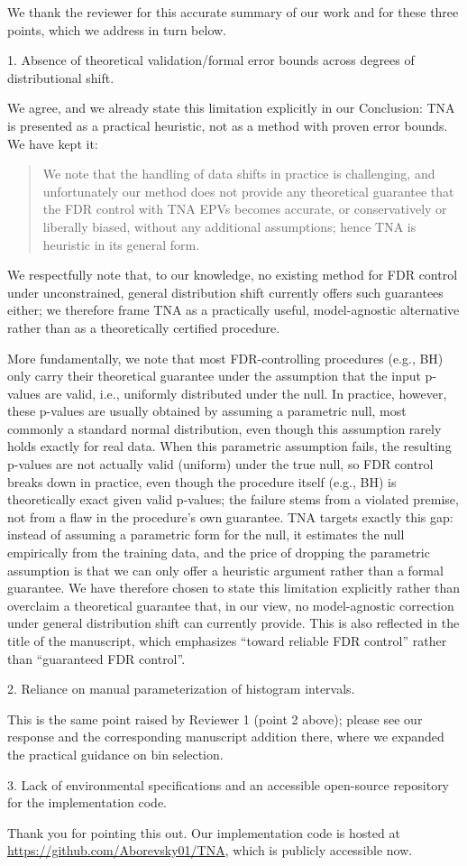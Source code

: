 \documentclass{article}
\newcommand{\response}[1]{\vspace*{1ex} \color{blue} \noindent #1 \color{black}
\vspace*{2ex}}
\newcommand{\edit}[1]{\begin{quotation}\color{red}\noindent #1
\color{black}\end{quotation}}
\begin{document}
\response{We thank the reviewer for this accurate summary of our work and for these three points, which we address in turn below.}

1. Absence of theoretical validation/formal error bounds across degrees of distributional shift.

\response{We agree, and we already state this limitation explicitly in our Conclusion: TNA is presented as a practical heuristic, not as a method with proven error bounds. We have kept it:}

\edit{We note that the handling of data shifts in practice is challenging, and unfortunately our method does not provide any theoretical guarantee that the FDR control with TNA EPVs becomes accurate, or conservatively or liberally biased, without any additional assumptions; hence TNA is heuristic in its general form. }

\response{We respectfully note that, to our knowledge, no existing method for FDR control under unconstrained, general distribution shift currently offers such guarantees either; we therefore frame TNA as a practically useful, model-agnostic alternative rather than as a theoretically certified procedure.}

\response{More fundamentally, we note that most FDR-controlling procedures (e.g., BH) only carry their theoretical guarantee under the assumption that the input p-values are valid, i.e., uniformly distributed under the null. In practice, however, these p-values are usually obtained by assuming a parametric null, most commonly a standard normal distribution, even though this assumption rarely holds exactly for real data. When this parametric assumption fails, the resulting p-values are not actually valid (uniform) under the true null, so FDR control breaks down in practice, even though the procedure itself (e.g., BH) is theoretically exact given valid p-values; the failure stems from a violated premise, not from a flaw in the procedure's own guarantee. TNA targets exactly this gap: instead of assuming a parametric form for the null, it estimates the null empirically from the training data, and the price of dropping the parametric assumption is that we can only offer a heuristic argument rather than a formal guarantee. We have therefore chosen to state this limitation explicitly rather than overclaim a theoretical guarantee that, in our view, no model-agnostic correction under general distribution shift can currently provide. This is also reflected in the title of the manuscript, which emphasizes ``toward reliable FDR control'' rather than ``guaranteed FDR control''.}

2. Reliance on manual parameterization of histogram intervals.

\response{This is the same point raised by Reviewer 1 (point 2 above); please see our response and the corresponding manuscript addition there, where we expanded the practical guidance on bin selection.}

3. Lack of environmental specifications and an accessible open-source repository for the implementation code.

\response{Thank you for pointing this out. Our implementation code is hosted at \url{https://github.com/Aborevsky01/TNA}, which is publicly accessible now.}
\end{document}
